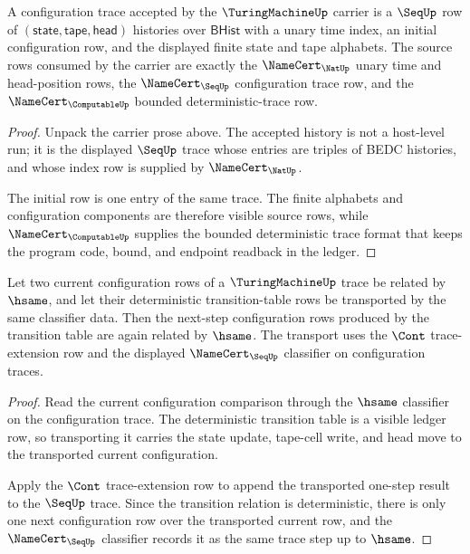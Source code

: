 \begin{theorem}
\label{thm:turingmachine-configuration-trace-carrier}
A configuration trace accepted by the $\TuringMachineUp$ carrier is a
$\SeqUp$ row of $(\mathsf{state},\mathsf{tape},\mathsf{head})$ histories over
$\mathsf{BHist}$ with a unary time index, an initial configuration row, and the
displayed finite state and tape alphabets. The source rows consumed by the
carrier are exactly the $\NameCert_{\NatUp}$ unary time and head-position rows,
the $\NameCert_{\SeqUp}$ configuration trace row, and the
$\NameCert_{\ComputableUp}$ bounded deterministic-trace row.
\end{theorem}
\begin{proof}
Unpack the carrier prose above. The accepted history is not a host-level run; it
is the displayed $\SeqUp$ trace whose entries are triples of BEDC histories, and
whose index row is supplied by $\NameCert_{\NatUp}$.

The initial row is one entry of the same trace. The finite alphabets and
configuration components are therefore visible source rows, while
$\NameCert_{\ComputableUp}$ supplies the bounded deterministic trace format
that keeps the program code, bound, and endpoint readback in the ledger.
\end{proof}

\begin{theorem}
\label{thm:turingmachine-deterministic-step-transport}
Let two current configuration rows of a $\TuringMachineUp$ trace be related by
$\hsame$, and let their deterministic transition-table rows be transported by
the same classifier data. Then the next-step configuration rows produced by the
transition table are again related by $\hsame$. The transport uses the
$\Cont$ trace-extension row and the displayed $\NameCert_{\SeqUp}$ classifier
on configuration traces.
\end{theorem}
\begin{proof}
Read the current configuration comparison through the $\hsame$ classifier on the
configuration trace. The deterministic transition table is a visible ledger row,
so transporting it carries the state update, tape-cell write, and head move to
the transported current configuration.

Apply the $\Cont$ trace-extension row to append the transported one-step result
to the $\SeqUp$ trace. Since the transition relation is deterministic, there is
only one next configuration row over the transported current row, and the
$\NameCert_{\SeqUp}$ classifier records it as the same trace step up to
$\hsame$.
\end{proof}

